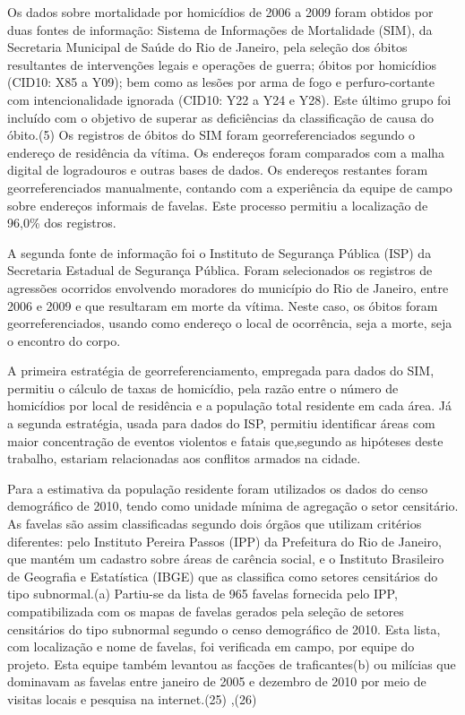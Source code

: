 \documentclass{article}
\begin{document}
Os dados sobre mortalidade por homicídios de 2006 a 2009 foram obtidos por duas
fontes de informação: Sistema de Informações de Mortalidade (SIM), da Secretaria
Municipal de Saúde do Rio de Janeiro, pela seleção dos óbitos resultantes de
intervenções legais e operações de guerra; óbitos por homicídios (CID10: X85 a
Y09); bem como as lesões por arma de fogo e perfuro-cortante com
intencionalidade ignorada (CID10: Y22 a Y24 e Y28). Este último grupo foi
incluído com o objetivo de superar as deficiências da classificação de causa do
óbito.(5)
Os registros de óbitos do SIM foram georreferenciados segundo o endereço de
residência da vítima. Os endereços foram comparados com a malha digital de
logradouros e outras bases de dados. Os endereços restantes foram
georreferenciados manualmente, contando com a experiência da equipe de campo
sobre endereços informais de favelas. Este processo permitiu a localização de
96,0\% dos registros.

A segunda fonte de informação foi o Instituto de Segurança Pública (ISP) da
Secretaria Estadual de Segurança Pública. Foram selecionados os registros de
agressões ocorridos envolvendo moradores do município do Rio de Janeiro, entre
2006 e 2009 e que resultaram em morte da vítima. Neste caso, os óbitos foram
georreferenciados, usando como endereço o local de ocorrência, seja a morte,
seja o encontro do corpo.

A primeira estratégia de georreferenciamento, empregada para dados do SIM,
permitiu o cálculo de taxas de homicídio, pela razão entre o número de
homicídios por local de residência e a população total residente em cada área.
Já a segunda estratégia, usada para dados do ISP, permitiu identificar áreas com
maior concentração de eventos violentos e fatais que,segundo as hipóteses deste
trabalho, estariam relacionadas aos conflitos armados na cidade.

Para a estimativa da população residente foram utilizados os dados do censo
demográfico de 2010, tendo como unidade mínima de agregação o setor censitário.
As favelas são assim classificadas segundo dois órgãos que utilizam critérios
diferentes: pelo Instituto Pereira Passos (IPP) da Prefeitura do Rio de Janeiro,
que mantém um cadastro sobre áreas de carência social, e o Instituto Brasileiro
de Geografia e Estatística (IBGE) que as classifica como setores censitários do
tipo subnormal.(a)
Partiu-se da lista de 965 favelas fornecida pelo IPP, compatibilizada com os
mapas de favelas gerados pela seleção de setores censitários do tipo subnormal
segundo o censo demográfico de 2010. Esta lista, com localização e nome de
favelas, foi verificada em campo, por equipe do projeto. Esta equipe também
levantou as facções de traficantes(b)
ou milícias que dominavam as favelas entre janeiro de 2005 e dezembro de 2010
por meio de visitas locais e pesquisa na internet.(25)
,(26)
\end{document}
